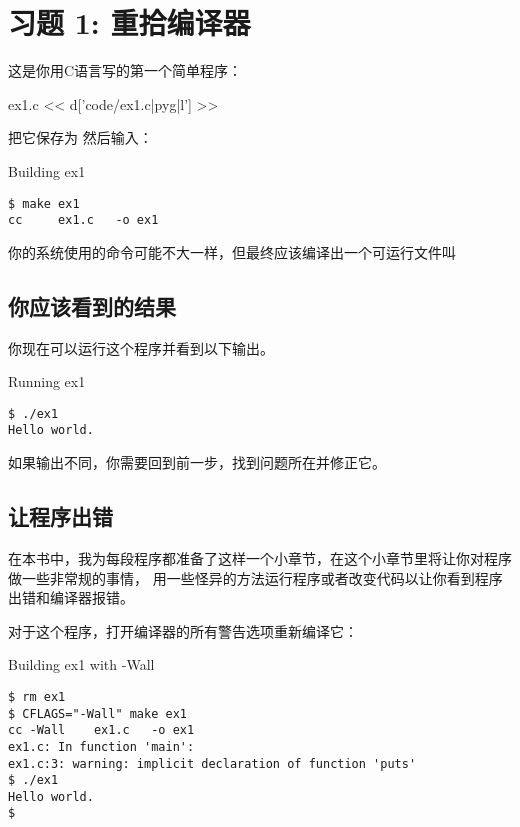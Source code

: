 \chapter{习题 1: 重拾编译器}

这是你用C语言写的第一个简单程序：

\begin{code}{ex1.c}
<< d['code/ex1.c|pyg|l'] >>
\end{code}

把它保存为  然后输入：

\begin{Terminal}{Building ex1}
\begin{lstlisting}
$ make ex1
cc     ex1.c   -o ex1
\end{lstlisting}
\end{Terminal}

你的系统使用的命令可能不大一样，但最终应该编译出一个可运行文件叫 

\section{你应该看到的结果}

你现在可以运行这个程序并看到以下输出。

\begin{Terminal}{Running ex1}
\begin{lstlisting}
$ ./ex1
Hello world.
\end{lstlisting}
\end{Terminal}

如果输出不同，你需要回到前一步，找到问题所在并修正它。

\section{让程序出错}

在本书中，我为每段程序都准备了这样一个小章节，在这个小章节里将让你对程序做一些非常规的事情，
用一些怪异的方法运行程序或者改变代码以让你看到程序出错和编译器报错。

对于这个程序，打开编译器的所有警告选项重新编译它：

\begin{Terminal}{Building ex1 with -Wall}
\begin{lstlisting}
$ rm ex1
$ CFLAGS="-Wall" make ex1
cc -Wall    ex1.c   -o ex1
ex1.c: In function 'main':
ex1.c:3: warning: implicit declaration of function 'puts'
$ ./ex1
Hello world.
$ 
\end{lstlisting}
\end{Terminal}


